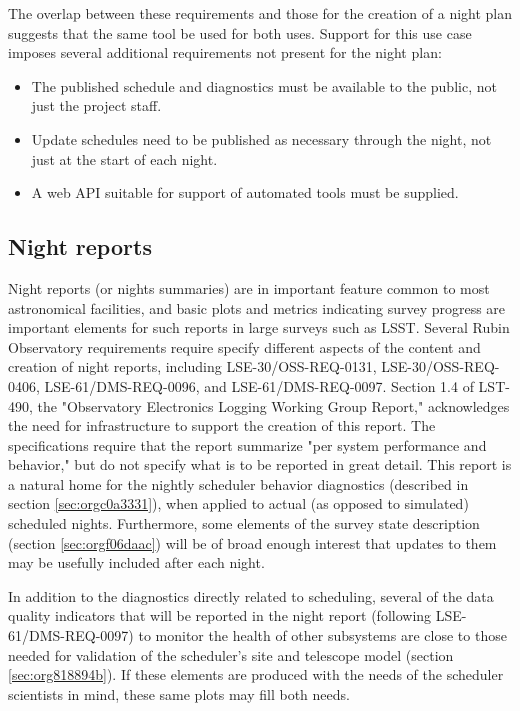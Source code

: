 The overlap between these requirements and those for the creation of a night plan suggests that the same tool be used for both uses. 
Support for this use case imposes several additional requirements not present for the night plan:
\begin{itemize}
\item The published schedule and diagnostics must be available to the public, not just the project staff.
\item Update schedules need to be published as necessary through the night, not just at the start of each night.
\item A web API suitable for support of automated tools must be supplied.
\end{itemize}

\subsection{Night reports}
\label{sec:org254cb85}
Night reports (or nights summaries) are in important feature common to most astronomical facilities, and basic plots and metrics indicating survey progress are important elements for such reports in large surveys such as LSST.
Several Rubin Observatory requirements require specify different aspects of the content and creation of night reports, including LSE-30/OSS-REQ-0131, LSE-30/OSS-REQ-0406, LSE-61/DMS-REQ-0096, and LSE-61/DMS-REQ-0097. Section 1.4 of LST-490, the "Observatory Electronics Logging Working Group Report," acknowledges the need for infrastructure to support the creation of this report.
The specifications require that the report summarize "per system performance and behavior," but do not specify what is to be reported in great detail.
This report is a natural home for the nightly scheduler behavior diagnostics (described in section \ref{sec:orgc0a3331}), when applied to actual (as opposed to simulated) scheduled nights.
Furthermore, some elements of the survey state description (section \ref{sec:orgf06daac}) will be of broad enough interest that updates to them may be usefully included after each night.

In addition to the diagnostics directly related to scheduling, several of the data quality indicators that will be reported in the night report (following LSE-61/DMS-REQ-0097) to monitor the health of other subsystems are close to those needed for validation of the scheduler's site and telescope model (section \ref{sec:org818894b}). If these elements are produced with the needs of the scheduler scientists in mind, these same plots may fill both needs.


